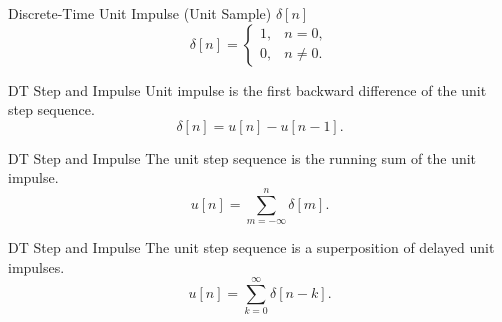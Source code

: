 \begin{frame}[plain]{Discrete-Time Unit Impulse (Unit Sample) $\delta[n]$}
    \begin{equation}
        \delta[n] = \begin{cases}
                 1, & n = 0,\\
                 0, & n \neq 0.
               \end{cases}
    \end{equation}
    {
        {
            \centering
            
        }
    }
\end{frame}



\begin{frame}[plain]{DT Step and Impulse}
    Unit impulse is the first backward difference of the unit step sequence.
    \begin{equation}
        \delta[n] = u[n] - u[n-1].
    \end{equation}
    {
        \vspace{1in}
    }

    {
        {
            \centering
            
        }
    }
\end{frame}

\begin{frame}[plain]{DT Step and Impulse}
    The unit step sequence is the running sum of the unit impulse.
    \begin{equation}
        u[n] = \sum_{m=-\infty}^{n}\delta[m].
    \end{equation}
    {
        \vspace{1in}
    }
    \pause
    {
        {
            \centering
            
        }
    }
\end{frame}




\begin{frame}[plain]{DT Step and Impulse}
    The unit step sequence is a superposition of delayed unit impulses.
    \begin{equation}
        u[n] = \sum_{k=0}^{\infty}\delta[n-k].
    \end{equation}
    {
        \vspace{1in}
    }
    \pause
    {
        {
            \centering
            
        }
    }
\end{frame}





